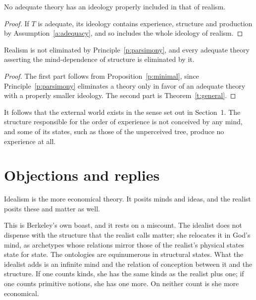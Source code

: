 \documentclass{situationist-preprint}
\begin{document}
\begin{proposition}\label{p:minimal}
No adequate theory has an ideology properly included in that of realism.
\end{proposition}

\begin{proof}
If $T$ is adequate, its ideology contains experience, structure and production by Assumption~\ref{a:adequacy}, and so includes the whole ideology of realism.
\end{proof}

\begin{corollary}\label{c:undominated}
Realism is not eliminated by Principle~\ref{p:parsimony}, and every adequate theory asserting the mind-dependence of structure is eliminated by it.
\end{corollary}

\begin{proof}
The first part follows from Proposition~\ref{p:minimal}, since Principle~\ref{p:parsimony} eliminates a theory only in favor of an adequate theory with a properly smaller ideology. The second part is Theorem~\ref{t:general}.
\end{proof}

It follows that the external world exists in the sense set out in Section~1. The structure responsible for the order of experience is not conceived by any mind, and some of its states, such as those of the unperceived tree, produce no experience at all.

\section{Objections and replies}

\begin{objection}
Idealism is the more economical theory. It posits minds and ideas, and the realist posits these and matter as well.
\end{objection}

\begin{reply}
This is Berkeley's own boast, and it rests on a miscount. The idealist does not dispense with the structure that the realist calls matter; she relocates it in God's mind, as archetypes whose relations mirror those of the realist's physical states state for state. The ontologies are equinumerous in structural states. What the idealist adds is an infinite mind and the relation of conception between it and the structure. If one counts kinds, she has the same kinds as the realist plus one; if one counts primitive notions, she has one more. On neither count is she more economical.
\end{reply}
\end{document}
